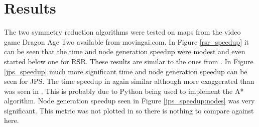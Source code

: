 \documentclass[12pt]{article}
\begin{document}
\section{Results}
The two symmetry reduction algorithms were tested on maps from the video game Dragon Age Two available from movingai.com.
In Figure \ref{rsr_speedup} it can be seen that the time and node generation speedup were modest and even started below one for RSR. 
These results are similar to the ones from \cite{Har2010}. In Figure \ref{jps_speedup} much more significant time and node generation speedup
can be seen for JPS. The time speedup in again similar although more exaggerated than was seen in \cite{Har2011}. This is probably due to Python
being used to implement the A* algorithm. Node generation speedup seen in Figure \ref{jps_speedup:nodes} was very significant. This metric was not
plotted in \cite{Har2011} so there is nothing to compare against here.
\end{document}
